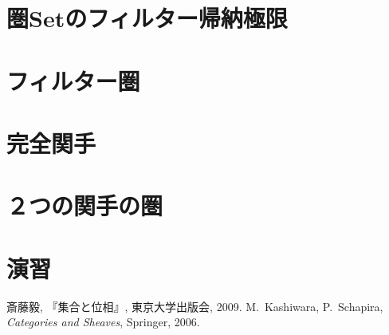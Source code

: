 \documentclass[a5paper, dvipdfmx]{jsbook}
\theoremstyle{definition}
\numberwithin{equation}{section} %
\begin{document}
\section{圏$\mathbf{Set}$のフィルター帰納極限}
\section{フィルター圏}
\section{完全関手}
\section{２つの関手の圏}
\section*{演習}


\begin{thebibliography}{20}
\par
   斎藤毅, 『集合と位相』, 東京大学出版会, 2009.
   M.\ Kashiwara, P.\ Schapira, \textit{Categories and Sheaves}, Springer, 2006.
\end{thebibliography}
\end{document}
